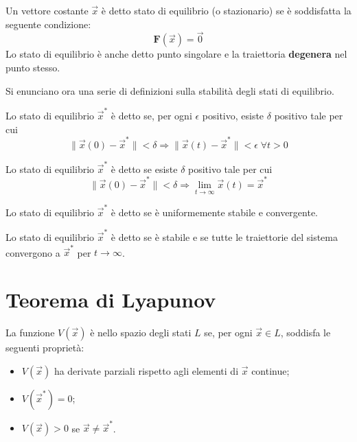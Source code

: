 Un vettore costante $\vec{x}$ è detto stato di equilibrio (o stazionario) se è soddisfatta la seguente condizione:
\begin{displaymath}
	\mathbf{F}(\vec{x}) = \vec{0}
\end{displaymath}
Lo stato di equilibrio è anche detto punto singolare e la traiettoria \textbf{degenera} nel punto stesso.

Si enunciano ora una serie di definizioni sulla stabilità degli stati di equilibrio.
\begin{mydef}
	Lo stato di equilibrio $\vec{x}^*$ è detto  se, per ogni $\epsilon$ positivo, esiste $\delta$ positivo tale per cui
	\begin{displaymath}
		\|\vec{x}(0) - \vec{x}^* \| < \delta \Rightarrow \|\vec{x}(t) - \vec{x}^* \| < \epsilon \;\forall t > 0
	\end{displaymath}
\end{mydef}

\begin{mydef}
	Lo stato di equilibrio $\vec{x}^*$ è detto  se esiste $\delta$ positivo tale per cui
	\begin{displaymath}
		\|\vec{x}(0) - \vec{x}^* \| < \delta \Rightarrow \lim_{t \rightarrow \infty} \vec{x}(t) = \vec{x}^*
	\end{displaymath}
\end{mydef}

\begin{mydef}
	Lo stato di equilibrio $\vec{x}^*$ è detto  se è uniformemente stabile e convergente.
\end{mydef}

\begin{mydef}
	Lo stato di equilibrio $\vec{x}^*$ è detto  se è stabile e se tutte le traiettorie del sistema convergono a $\vec{x}^*$ per $t \rightarrow \infty$.
\end{mydef}

\section{Teorema di Lyapunov}
\label{sub:teorema_di_lyapunov}

\begin{mydef}
	La funzione $V(\vec{x})$ è  nello spazio degli stati $L$ se, per ogni $\vec{x} \in L$, soddisfa le seguenti proprietà:
	\begin{itemize}
		\item $V(\vec{x})$ ha derivate parziali rispetto agli elementi di $\vec{x}$ continue;
		\item $V(\vec{x}^*)=0$;
		\item $V(\vec{x})>0$ se $\vec{x} \neq \vec{x}^*$.
	\end{itemize}
\end{mydef}


